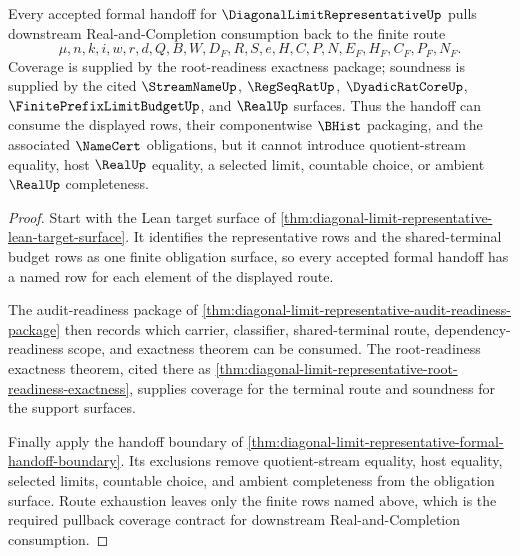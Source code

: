 \begin{theorem}
\label{thm:diagonal-limit-representative-terminal-pullback-coverage}
Every accepted formal handoff for $\DiagonalLimitRepresentativeUp$ pulls downstream Real-and-Completion consumption back to the finite route
$$
\mu,n,k,i,w,r,d,Q,B,W,D_F,R,S,e,H,C,P,N,E_F,H_F,C_F,P_F,N_F.
$$
Coverage is supplied by the root-readiness exactness package; soundness is supplied by the cited $\StreamNameUp$, $\RegSeqRatUp$, $\DyadicRatCoreUp$, $\FinitePrefixLimitBudgetUp$, and $\RealUp$ surfaces. Thus the handoff can consume the displayed rows, their componentwise $\BHist$ packaging, and the associated $\NameCert$ obligations, but it cannot introduce quotient-stream equality, host $\RealUp$ equality, a selected limit, countable choice, or ambient $\RealUp$ completeness.
\end{theorem}
\begin{proof}
Start with the Lean target surface of \autoref{thm:diagonal-limit-representative-lean-target-surface}. It identifies the representative rows and the shared-terminal budget rows as one finite obligation surface, so every accepted formal handoff has a named row for each element of the displayed route.

The audit-readiness package of \autoref{thm:diagonal-limit-representative-audit-readiness-package} then records which carrier, classifier, shared-terminal route, dependency-readiness scope, and exactness theorem can be consumed. The root-readiness exactness theorem, cited there as \autoref{thm:diagonal-limit-representative-root-readiness-exactness}, supplies coverage for the terminal route and soundness for the support surfaces.

Finally apply the handoff boundary of \autoref{thm:diagonal-limit-representative-formal-handoff-boundary}. Its exclusions remove quotient-stream equality, host equality, selected limits, countable choice, and ambient completeness from the obligation surface. Route exhaustion leaves only the finite rows named above, which is the required pullback coverage contract for downstream Real-and-Completion consumption.
\end{proof}

